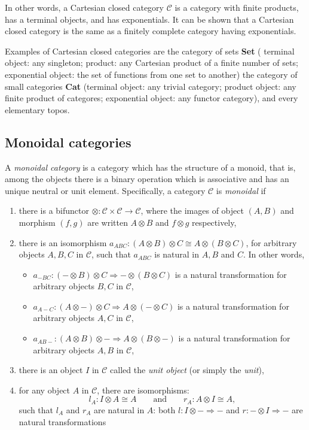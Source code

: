 \documentclass[10pt]{article}
\theoremstyle{plain}
\theoremstyle{definition}
\theoremstyle{remark}
\begin{document}
In other words, a Cartesian closed category $\mathcal{C}$ is a category with finite products, has a terminal objects, and has exponentials.  It can be shown that a Cartesian closed category is the same as a finitely complete category having exponentials.

Examples of Cartesian closed categories are the category of sets \textbf{Set} ( terminal object: any singleton; product: any Cartesian product of a finite number of sets; exponential object: the set of functions from one set to another)  the category of small categories \textbf{Cat} (terminal object: any trivial category; product object: any finite product of categores; exponential object: any functor category), and every elementary topos.
\subsection{Monoidal categories}
A \emph{monoidal category} is a category which has the structure of a monoid, that is, among the objects there is a binary operation which is associative and has an unique neutral or unit element.   Specifically, a category $\mathcal{C}$ is \emph{monoidal} if
\begin{enumerate}
\item there is a bifunctor $\otimes: \mathcal{C}\times\mathcal{C}\to \mathcal{C}$, where the images of object $(A,B)$ and morphism $(f,g)$ are written $A\otimes B$ and $f\otimes g$ respectively,
\item there is an isomorphism $a_{ABC}: (A\otimes B)\otimes C \cong A\otimes (B\otimes C)$, for arbitrary objects $A,B,C$ in $\mathcal{C}$, such that $a_{ABC}$ is natural in $A,B$ and $C$.  In other words,
\begin{itemize}
\item $a_{-BC}: (-\otimes B)\otimes C \Rightarrow -\otimes(B\otimes C)$ is a natural transformation for arbitrary objects $B,C$ in $\mathcal{C}$,
\item $a_{A-C}: (A\otimes -)\otimes C \Rightarrow A\otimes(-\otimes C)$ is a natural transformation for arbitrary objects $A,C$ in $\mathcal{C}$,
\item $a_{AB-}: (A\otimes B)\otimes - \Rightarrow A\otimes(B\otimes -)$ is a natural transformation for arbitrary objects $A,B$ in $\mathcal{C}$,
\end{itemize}
\item there is an object $I$ in $\mathcal{C}$ called the \emph{unit object} (or simply the \emph{unit}),
\item for any object $A$ in $\mathcal{C}$, there are isomorphisms:
$$l_A: I\otimes A\cong A \qquad \mbox{and} \qquad r_A: A\otimes I\cong A,$$
such that $l_A$ and $r_A$ are natural in $A$: both $l: I\otimes - \Rightarrow -$ and $r: -\otimes I\Rightarrow - $ are natural transformations
\end{enumerate}
\end{document}
